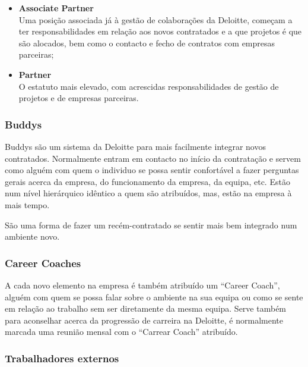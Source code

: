 \begin{itemize}
                \item \textbf{Associate Partner} \\
                    Uma posição associada já à gestão de colaborações da Deloitte, começam a ter responsabilidades em relação aos novos contratados e a que projetos é que são alocados, bem como o contacto e fecho de contratos com empresas parceiras;
                \item \textbf{Partner} \\
                    O estatuto mais elevado, com acrescidas responsabilidades de gestão de projetos e de empresas parceiras.
            \end{itemize}

        
        \subsubsection{Buddys}

            Buddys são um sistema da Deloitte para mais facilmente integrar novos contratados. Normalmente entram em contacto no início da contratação e servem como alguém com quem o individuo se possa sentir confortável a fazer perguntas gerais acerca da empresa, do funcionamento da empresa, da equipa, etc. Estão num nível hierárquico idêntico a quem são atribuídos, mas, estão na empresa à mais tempo. 

            São uma forma de fazer um recém-contratado se sentir mais bem integrado num ambiente novo.
            
        \subsubsection{Career Coaches}
        
            A cada novo elemento na empresa é também atribuído um ``Career Coach'', alguém com quem se possa falar sobre o ambiente na sua equipa ou como se sente em relação ao trabalho sem ser diretamente da mesma equipa. Serve também para aconselhar acerca da progressão de carreira na Deloitte, é normalmente marcada uma reunião mensal com o ``Carrear Coach'' atribuído.

        \subsubsection{Trabalhadores externos}

